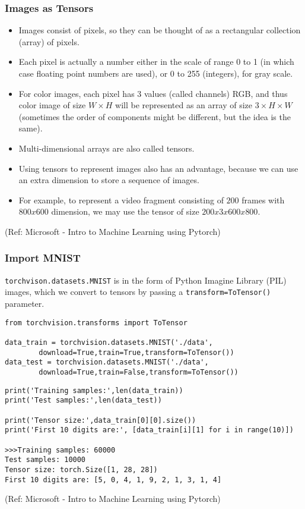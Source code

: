 \begin{frame}[fragile] \frametitle{Images as Tensors}


\begin{itemize}
\item Images consist of pixels, so they can be thought of as a rectangular collection (array) of pixels.
\item Each pixel is actually a number either in the scale of range 0 to 1 (in which case floating point numbers are used), or 0 to 255 (integers), for gray scale.
\item For color images, each pixel has 3 values (called channels) RGB, and thus color image of size  $W×H$  will be represented as an array of size $3×H×W$
  (sometimes the order of components might be different, but the idea is the same).
	\item Multi-dimensional arrays are also called tensors. 
	\item Using tensors to represent images also has an advantage, because we can use an extra dimension to store a sequence of images.
	\item For example, to represent a video fragment consisting of $200$ frames with $800x600$ dimension, we may use the tensor of size $200x3x600x800$.
\end{itemize}


\tiny{(Ref: Microsoft - Intro to Machine Learning using Pytorch)}
\end{frame}


\begin{frame}[fragile] \frametitle{Import MNIST}

\lstinline|torchvison.datasets.MNIST| is  in the form of Python Imagine Library (PIL) images, which we convert to tensors by passing a \lstinline|transform=ToTensor()| parameter.

\begin{lstlisting}
from torchvision.transforms import ToTensor

data_train = torchvision.datasets.MNIST('./data',
        download=True,train=True,transform=ToTensor())
data_test = torchvision.datasets.MNIST('./data',
        download=True,train=False,transform=ToTensor())
\end{lstlisting}

\begin{lstlisting}
print('Training samples:',len(data_train))
print('Test samples:',len(data_test))

print('Tensor size:',data_train[0][0].size())
print('First 10 digits are:', [data_train[i][1] for i in range(10)])

>>>Training samples: 60000
Test samples: 10000
Tensor size: torch.Size([1, 28, 28])
First 10 digits are: [5, 0, 4, 1, 9, 2, 1, 3, 1, 4]
\end{lstlisting}



\tiny{(Ref: Microsoft - Intro to Machine Learning using Pytorch)}
\end{frame}

